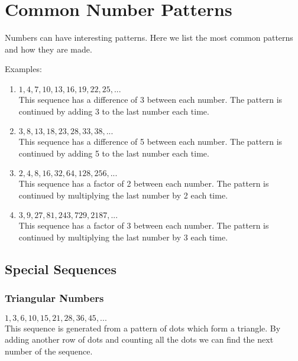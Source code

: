 \documentclass[10pt,a4paper,titlepage,twoside,openright]{report}
\begin{document}
\section{Common Number Patterns}
Numbers can have interesting patterns. Here we list the most common patterns and how they are made.

Examples:
\begin{enumerate}
\item{$1, 4, 7, 10, 13, 16, 19, 22, 25, ...$}\\

This sequence has a difference of 3 between each number. 
The pattern is continued by adding 3 to the last number each time. 

\item{$3, 8, 13, 18, 23, 28, 33, 38, ...$}\\

This sequence has a difference of 5 between each number. 
The pattern is continued by adding 5 to the last number each time.
 
\item{$2, 4, 8, 16, 32, 64, 128, 256, ...$}\\

This sequence has a factor of 2 between each number.
The pattern is continued by multiplying the last number by 2 each time. 

\item{$3, 9, 27, 81, 243, 729, 2187, ...$}\\

This sequence has a factor of 3 between each number.
The pattern is continued by multiplying the last number by 3 each time. 
\end{enumerate}
 
\subsection{Special Sequences} 

\subsubsection{Triangular Numbers} 

$1, 3, 6, 10, 15, 21, 28, 36, 45, ...$\\

This sequence is generated from a pattern of dots which form a triangle. 
By adding another row of dots and counting all the dots we can find the next number of the sequence. 
 
\end{document}
